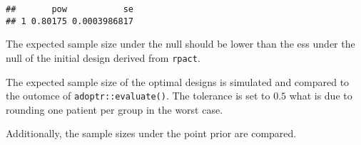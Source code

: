 \documentclass[]{book}
\newenvironment{Shaded}{\begin{snugshade}}{\end{snugshade}}
\newcommand{\DataTypeTok}[1]{\textcolor[rgb]{0.13,0.29,0.53}{#1}}
\newcommand{\DecValTok}[1]{\textcolor[rgb]{0.00,0.00,0.81}{#1}}
\newcommand{\FloatTok}[1]{\textcolor[rgb]{0.00,0.00,0.81}{#1}}
\newcommand{\KeywordTok}[1]{\textcolor[rgb]{0.13,0.29,0.53}{\textbf{#1}}}
\newcommand{\NormalTok}[1]{#1}
\newcommand{\OperatorTok}[1]{\textcolor[rgb]{0.81,0.36,0.00}{\textbf{#1}}}
\begin{document}
\begin{verbatim}
##       pow           se
## 1 0.80175 0.0003986817
\end{verbatim}

The expected sample size under the null should be lower than the ess under the
null of the initial design derived from \texttt{rpact}.

\begin{Shaded}
\end{Shaded}

The expected sample size of the optimal designs is simulated and compared
to the outomce of \texttt{adoptr::evaluate()}.
The tolerance is set to \(0.5\) what is due to rounding one patient per group
in the worst case.

\begin{Shaded}
\end{Shaded}

Additionally, the sample sizes under the point prior are compared.

\begin{Shaded}
\end{Shaded}
\end{document}
